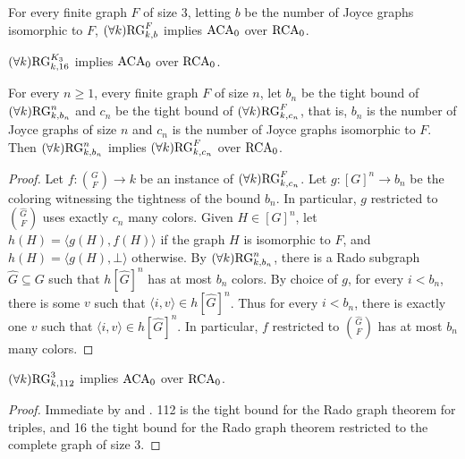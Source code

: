 \begin{corollary}\label{cor:rado-graph-3-aca}
For every finite graph $F$ of size $3$, letting $b$ be the number of Joyce graphs isomorphic to $F$, $(\forall k)\mathrm{RG}^{F}_{k, b}$ implies $\mathrm{ACA}_0$ over $\mathrm{RCA}_0$.
\end{corollary}

\begin{corollary}\label{cor:rado-graph-complete-3-aca}
$(\forall k)\mathrm{RG}^{K_3}_{k, 16}$ implies $\mathrm{ACA}_0$ over $\mathrm{RCA}_0$.
\end{corollary}

\begin{theorem}\label{thm:rado-graph-tight-tuple-to-graph}
For every $n \geq 1$, every finite graph $F$ of size $n$,
let $b_n$ be the tight bound of $(\forall k)\mathrm{RG}^n_{k, b_n}$ and $c_n$ be the tight bound of $(\forall k)\mathrm{RG}^F_{k, c_n}$, that is, $b_n$ is the number of Joyce graphs of size $n$
and $c_n$ is the number of Joyce graphs isomorphic to $F$.
Then $(\forall k)\mathrm{RG}^n_{k, b_n}$ implies  $(\forall k)\mathrm{RG}^F_{k, c_n}$ over $\mathrm{RCA}_0$.
\end{theorem}
\begin{proof}
Let $f: {G \choose F} \to k$ be an instance of $(\forall k)\mathrm{RG}^F_{k, c_n}$.
Let $g: [G]^n \to b_n$ be the coloring witnessing the tightness of the bound $b_n$.
In particular, $g$ restricted to ${\hat{G} \choose F}$ uses exactly $c_n$ many colors.
Given $H \in [G]^n$, let $h(H) = \langle g(H), f(H) \rangle$ if the graph $H$ is isomorphic to $F$, and $h(H) = \langle g(H), \bot \rangle$ otherwise. 
By $(\forall k)\mathrm{RG}^n_{k, b_n}$, there is a Rado subgraph $\hat{G} \subseteq G$
such that $h[\hat{G}]^n$ has at most $b_n$ colors. By choice of $g$,
for every $i < b_n$, there is some $v$ such that $\langle i, v\rangle \in h[\hat{G}]^n$.
Thus for every $i < b_n$, there is exactly one $v$ such that $\langle i, v\rangle \in h[\hat{G}]^n$. In particular, $f$ restricted to ${\hat{G} \choose F}$ has at most $b_n$ many colors.
\end{proof}


\begin{corollary}
$(\forall k)\mathrm{RG}^3_{k, 112}$ implies $\mathrm{ACA}_0$ over $\mathrm{RCA}_0$.
\end{corollary}
\begin{proof}
Immediate by  and .
112 is the tight bound for the Rado graph theorem for triples, and 16 the tight bound for the Rado graph theorem restricted to the complete graph of size 3.
\end{proof}

